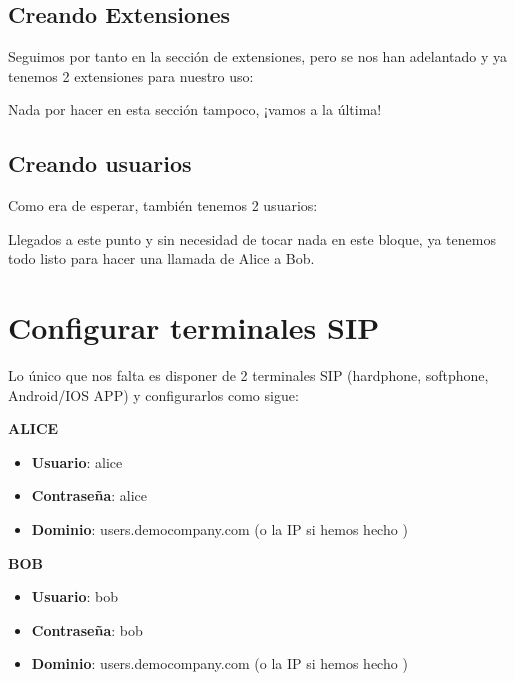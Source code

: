 \documentclass[letterpaper,10pt,spanish]{sphinxmanual}
\begin{document}
\noindent{}


\subsection{Creando Extensiones}
\label{internal_calls/company_portal:creating-extensions}
Seguimos por tanto en la sección de extensiones, pero se nos han adelantado y ya tenemos 2 extensiones para nuestro uso:

\noindent{}

Nada por hacer en esta sección tampoco, ¡vamos a la última!


\subsection{Creando usuarios}
\label{internal_calls/company_portal:creating-users}
Como era de esperar, también tenemos 2 usuarios:

\noindent{}

Llegados a este punto y sin necesidad de tocar nada en este bloque, ya tenemos todo listo para hacer una llamada de Alice a Bob.


\section{Configurar terminales SIP}
\label{internal_calls/configure_sipuacs:sip-terminal-configuration}\label{internal_calls/configure_sipuacs::doc}
Lo único que nos falta es disponer de 2 terminales SIP (hardphone, softphone, Android/IOS APP) y configurarlos como sigue:

\textbf{ALICE}
\begin{itemize}
\item {} 
\textbf{Usuario}: alice

\item {} 
\textbf{Contraseña}: alice

\item {} 
\textbf{Dominio}: users.democompany.com (o la IP si hemos hecho {\hyperref[internal_calls/brand_portal:dnshack]{}})

\end{itemize}

\textbf{BOB}
\begin{itemize}
\item {} 
\textbf{Usuario}: bob

\item {} 
\textbf{Contraseña}: bob

\item {} 
\textbf{Dominio}: users.democompany.com (o la IP si hemos hecho {\hyperref[internal_calls/brand_portal:dnshack]{}})

\end{itemize}
\end{document}
